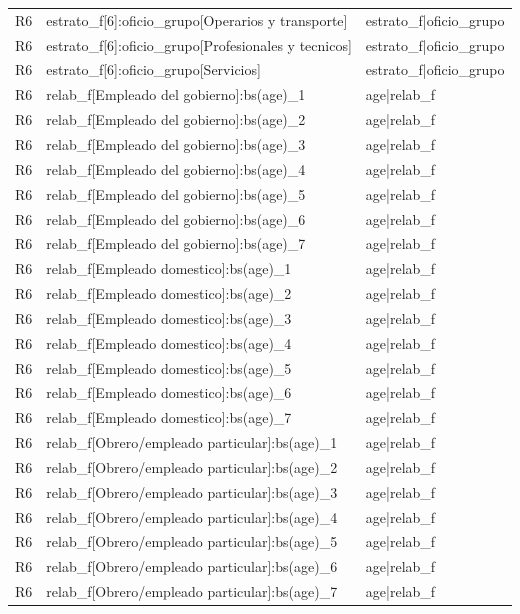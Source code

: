 \begin{longtable}{lll}
R6 & estrato\_f[6]:oficio\_grupo[Operarios y transporte] & estrato\_f|oficio\_grupo \\
R6 & estrato\_f[6]:oficio\_grupo[Profesionales y tecnicos] & estrato\_f|oficio\_grupo \\
R6 & estrato\_f[6]:oficio\_grupo[Servicios] & estrato\_f|oficio\_grupo \\
R6 & relab\_f[Empleado del gobierno]:bs(age)\_1 & age|relab\_f \\
R6 & relab\_f[Empleado del gobierno]:bs(age)\_2 & age|relab\_f \\
R6 & relab\_f[Empleado del gobierno]:bs(age)\_3 & age|relab\_f \\
R6 & relab\_f[Empleado del gobierno]:bs(age)\_4 & age|relab\_f \\
R6 & relab\_f[Empleado del gobierno]:bs(age)\_5 & age|relab\_f \\
R6 & relab\_f[Empleado del gobierno]:bs(age)\_6 & age|relab\_f \\
R6 & relab\_f[Empleado del gobierno]:bs(age)\_7 & age|relab\_f \\
R6 & relab\_f[Empleado domestico]:bs(age)\_1 & age|relab\_f \\
R6 & relab\_f[Empleado domestico]:bs(age)\_2 & age|relab\_f \\
R6 & relab\_f[Empleado domestico]:bs(age)\_3 & age|relab\_f \\
R6 & relab\_f[Empleado domestico]:bs(age)\_4 & age|relab\_f \\
R6 & relab\_f[Empleado domestico]:bs(age)\_5 & age|relab\_f \\
R6 & relab\_f[Empleado domestico]:bs(age)\_6 & age|relab\_f \\
R6 & relab\_f[Empleado domestico]:bs(age)\_7 & age|relab\_f \\
R6 & relab\_f[Obrero/empleado particular]:bs(age)\_1 & age|relab\_f \\
R6 & relab\_f[Obrero/empleado particular]:bs(age)\_2 & age|relab\_f \\
R6 & relab\_f[Obrero/empleado particular]:bs(age)\_3 & age|relab\_f \\
R6 & relab\_f[Obrero/empleado particular]:bs(age)\_4 & age|relab\_f \\
R6 & relab\_f[Obrero/empleado particular]:bs(age)\_5 & age|relab\_f \\
R6 & relab\_f[Obrero/empleado particular]:bs(age)\_6 & age|relab\_f \\
R6 & relab\_f[Obrero/empleado particular]:bs(age)\_7 & age|relab\_f \\

\end{longtable}
